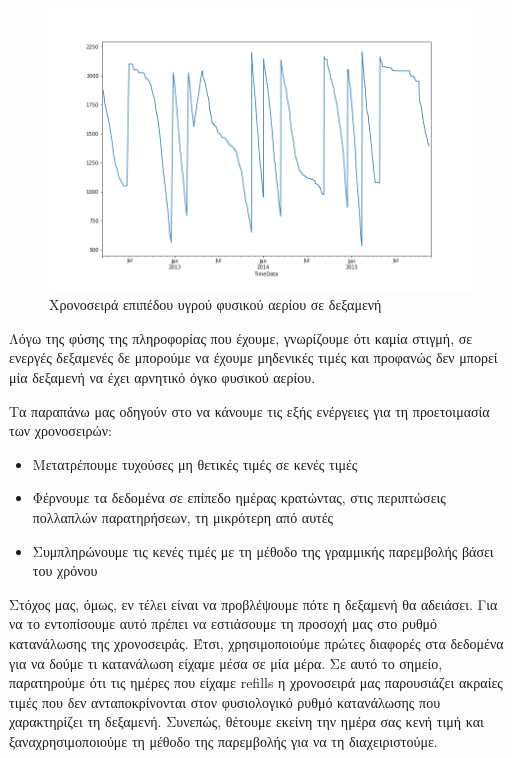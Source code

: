 \begin{figure}[t!]
  \includegraphics[scale=0.5]{figures/original.png}
\centering
\caption{Χρονοσειρά επιπέδου υγρού φυσικού αερίου σε δεξαμενή}
\label{originalTS}
\end{figure} 

Λόγω της φύσης της πληροφορίας που έχουμε, γνωρίζουμε ότι καμία στιγμή, σε ενεργές δεξαμενές δε μπορούμε να έχουμε μηδενικές τιμές και προφανώς δεν μπορεί μία δεξαμενή να έχει αρνητικό όγκο φυσικού αερίου. 

Τα παραπάνω μας οδηγούν στο να κάνουμε τις εξής ενέργειες για τη προετοιμασία των χρονοσειρών:

\begin{itemize}
    \item Μετατρέπουμε τυχούσες μη θετικές τιμές σε κενές τιμές
    \item Φέρνουμε τα δεδομένα σε επίπεδο ημέρας κρατώντας, στις περιπτώσεις πολλαπλών παρατηρήσεων, τη μικρότερη από αυτές
    \item Συμπληρώνουμε τις κενές τιμές με τη μέθοδο της γραμμικής παρεμβολής βάσει του χρόνου 
     \end {itemize}
     
Στόχος μας, όμως, εν τέλει είναι να προβλέψουμε πότε η δεξαμενή θα αδειάσει. Για να το εντοπίσουμε αυτό πρέπει να εστιάσουμε τη προσοχή μας στο ρυθμό κατανάλωσης της χρονοσειράς. Έτσι, χρησιμοποιούμε πρώτες διαφορές στα δεδομένα για να δούμε τι κατανάλωση είχαμε μέσα σε μία μέρα. Σε αυτό το σημείο, παρατηρούμε ότι τις ημέρες που είχαμε refills η χρονοσειρά μας παρουσιάζει ακραίες τιμές που δεν ανταποκρίνονται στον φυσιολογικό ρυθμό κατανάλωσης που χαρακτηρίζει τη δεξαμενή. Συνεπώς, θέτουμε εκείνη την ημέρα σας κενή τιμή και ξαναχρησιμοποιούμε τη μέθοδο της παρεμβολής για να τη διαχειριστούμε.

